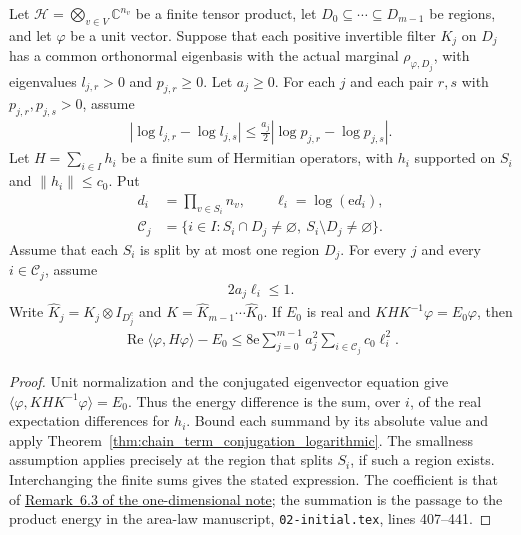 \begin{theorem}
    \label{thm:chain_logarithmic_energy}
    \leanok
    Let $\mathcal H=\bigotimes_{v\in V}\mathbb C^{n_v}$ be a finite
    tensor product, let $D_0\subseteq\cdots\subseteq D_{m-1}$ be
    regions, and let $\varphi$ be a unit vector. Suppose that each
    positive invertible filter $K_j$ on $D_j$ has a common
    orthonormal eigenbasis with the actual marginal
    $\rho_{\varphi,D_j}$, with eigenvalues $l_{j,r}>0$ and
    $p_{j,r}\ge0$. Let $a_j\ge0$. For each $j$ and each pair $r,s$
    with $p_{j,r},p_{j,s}>0$, assume
    \begin{align*}
        |\log l_{j,r}-\log l_{j,s}|
        \le\frac{a_j}{2}|\log p_{j,r}-\log p_{j,s}|.
    \end{align*}
    Let $H=\sum_{i\in I}h_i$ be a finite sum of Hermitian operators,
    with $h_i$ supported on $S_i$ and $\lVert h_i\rVert\le c_0$.
    Put
    \begin{align*}
        d_i          & =\prod_{v\in S_i}n_v,\qquad \ell_i=\log(\mathrm e d_i), \\
        \mathcal C_j & =\{i\in I:S_i\cap D_j\ne\varnothing,
        \ S_i\setminus D_j\ne\varnothing\}.
    \end{align*}
    Assume that each $S_i$ is split by at most one region $D_j$.
    For every $j$ and every $i\in\mathcal C_j$, assume
    \begin{align*}
        2a_j\ell_i\le1.
    \end{align*}
    Write $\widehat K_j=K_j\otimes I_{D_j^c}$ and
    $K=\widehat K_{m-1}\cdots\widehat K_0$. If $E_0$ is real and
    $KHK^{-1}\varphi=E_0\varphi$, then
    \begin{align*}
        \operatorname{Re}\langle\varphi,H\varphi\rangle-E_0
        \le8\mathrm e\sum_{j=0}^{m-1}a_j^2
        \sum_{i\in\mathcal C_j}c_0\ell_i^2.
    \end{align*}
\end{theorem}
\begin{proof}\leanok
    Unit normalization and the conjugated eigenvector equation give
    $\langle\varphi,KHK^{-1}\varphi\rangle=E_0$. Thus the energy
    difference is the sum, over $i$, of the real expectation
    differences for $h_i$. Bound each summand by its absolute value
    and apply Theorem~\ref{thm:chain_term_conjugation_logarithmic}.
    The smallness assumption applies precisely at the region that
    splits $S_i$, if such a region exists. Interchanging the finite
    sums gives the stated expression. The coefficient is that of
    \href{https://github.com/LionSR/TNLean/blob/67ea93e29f7c088f766b271208a2fde4cccf04a6/docs/notes/one_dimensional_note/part1_arealaw.tex#L711-L734}{Remark~6.3 of the one-dimensional note};
    the summation is the passage to the product energy in the
    area-law manuscript, \texttt{02-initial.tex}, lines 407--441.
\end{proof}

